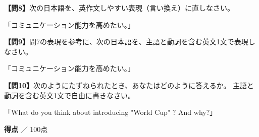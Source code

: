 \noindent\textbf{【問8】}次の日本語を、英作文しやすい表現（言い換え）に直しなさい。

「コミュニケーション能力を高めたい。」

\vfill

\noindent\textbf{【問9】}問7の表現を参考に、次の日本語を、主語と動詞を含む英文1文で表現しなさい。

「コミュニケーション能力を高めたい。」

\vfill

\noindent\textbf{【問10】}次のようにたずねられたとき、あなたはどのように答えるか。
主語と動詞を含む英文1文で自由に書きなさい。

「What do you think about introducing "World Cup" ? And why?」


\vfill
\begin{flushright}
\textbf{得点} \underline{\hspace{8em}} ／ 100点
\end{flushright}

